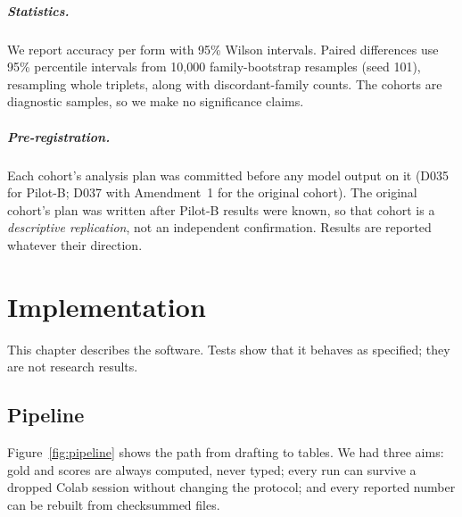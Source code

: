 \documentclass[12pt,a4paper,oneside]{report}
\renewcommand{\_}{\oldunderscore\allowbreak}
\begin{document}
\paragraph{Statistics.} We report accuracy per form with 95\% Wilson intervals. Paired differences use 95\% percentile intervals from 10,000 family-bootstrap resamples (seed 101), resampling whole triplets, along with discordant-family counts. The cohorts are diagnostic samples, so we make no significance claims.

\paragraph{Pre-registration.} Each cohort's analysis plan was committed before any model output on it (D035 for Pilot-B; D037 with Amendment~1 for the original cohort). The original cohort's plan was written after Pilot-B results were known, so that cohort is a \emph{descriptive replication}, not an independent confirmation. Results are reported whatever their direction.

\chapter{Implementation}
\label{ch:system}

This chapter describes the software. Tests show that it behaves as specified; they are not research results.

\section{Pipeline}

Figure~\ref{fig:pipeline} shows the path from drafting to tables. We had three aims: gold and scores are always computed, never typed; every run can survive a dropped Colab session without changing the protocol; and every reported number can be rebuilt from checksummed files.
\end{document}
